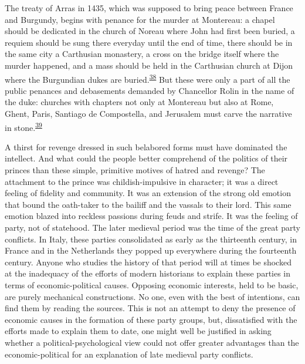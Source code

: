 The treaty of Arras in 1435, which was supposed to bring peace between
France and Burgundy, begins with penance for the murder at Montereau: a
chapel should be dedicated in the church of Noreau where John had first
been buried, a requiem should be sung there everyday until the end of
time, there should be in the same city a
\protect\hypertarget{08_Chapter_One__THE_PASSIONATE_INTE.xhtmlux5cux23page_17}{}{}Carthusian
monastery, a cross on the bridge itself where the murder happened, and a
mass should be held in the Carthusian church at Dijon where the
Burgundian dukes are
buried.\textsuperscript{\protect\hypertarget{08_Chapter_One__THE_PASSIONATE_INTE.xhtmlux5cux23id_2155}{\protect\hyperlink{23_NOTES.xhtmlux5cux23id_2156}{38}}}
But these were only a part of all the public penances and debasements
demanded by Chancellor Rolin in the name of the duke: churches with
chapters not only at Montereau but also at Rome, Ghent, Paris, Santiago
de Compostella, and Jerusalem must carve the narrative in
stone.\textsuperscript{\protect\hypertarget{08_Chapter_One__THE_PASSIONATE_INTE.xhtmlux5cux23id_2153}{\protect\hyperlink{23_NOTES.xhtmlux5cux23id_2154}{39}}}

A thirst for revenge dressed in such belabored forms must have dominated
the intellect. And what could the people better comprehend of the
politics of their princes than these simple, primitive motives of hatred
and revenge? The attachment to the prince was childish-impulsive in
character; it was a direct feeling of fidelity and community. It was an
extension of the strong old emotion that bound the oath-taker to the
bailiff and the vassals to their lord. This same emotion blazed into
reckless passions during feuds and strife. It was the feeling of party,
not of statehood. The later medieval period was the time of the great
party conflicts. In Italy, these parties consolidated as early as the
thirteenth century, in France and in the Netherlands they popped up
everywhere during the fourteenth century. Anyone who studies the history
of that period will at times be shocked at the inadequacy of the efforts
of modern historians to explain these parties in terms of
economic-political causes. Opposing economic interests, held to be
basic, are purely mechanical constructions. No one, even with the best
of intentions, can find them by reading the sources. This is not an
attempt to deny the presence of economic causes in the formation of
these party groups, but, dissatisfied with the efforts made to explain
them to date, one might well be justified in asking whether a
political-psychological view could not offer greater advantages than the
economic-political for an explanation of late medieval party conflicts.

